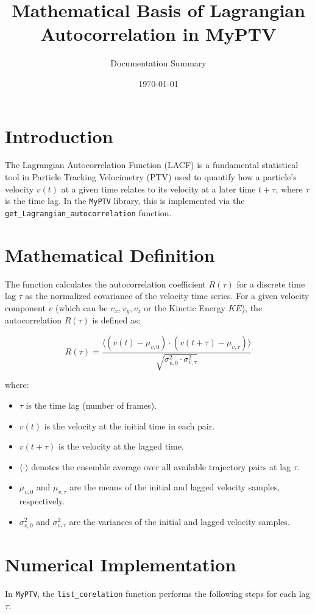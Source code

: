 \documentclass[12pt]{article}
\title{Mathematical Basis of Lagrangian Autocorrelation in MyPTV}
\author{Documentation Summary}
\date{\today}
\begin{document}
\maketitle

\section{Introduction}
The Lagrangian Autocorrelation Function (LACF) is a fundamental statistical tool in Particle Tracking Velocimetry (PTV) used to quantify how a particle's velocity $v(t)$ at a given time relates to its velocity at a later time $t + \tau$, where $\tau$ is the time lag. In the \texttt{MyPTV} library, this is implemented via the \texttt{get\_Lagrangian\_autocorrelation} function.

\section{Mathematical Definition}
The function calculates the autocorrelation coefficient $R(\tau)$ for a discrete time lag $\tau$ as the normalized covariance of the velocity time series. For a given velocity component $v$ (which can be $v_x, v_y, v_z$ or the Kinetic Energy $KE$), the autocorrelation $R(\tau)$ is defined as:

\begin{equation}
R(\tau) = \frac{\langle (v(t) - \mu_{v,0}) \cdot (v(t+\tau) - \mu_{v,\tau}) \rangle}{\sqrt{\sigma^2_{v,0} \cdot \sigma^2_{v,\tau}}}
\end{equation}

where:
\begin{itemize}
    \item $\tau$ is the time lag (number of frames).
    \item $v(t)$ is the velocity at the initial time in each pair.
    \item $v(t+\tau)$ is the velocity at the lagged time.
    \item $\langle \cdot \rangle$ denotes the ensemble average over all available trajectory pairs at lag $\tau$.
    \item $\mu_{v,0}$ and $\mu_{v,\tau}$ are the means of the initial and lagged velocity samples, respectively.
    \item $\sigma^2_{v,0}$ and $\sigma^2_{v,\tau}$ are the variances of the initial and lagged velocity samples.
\end{itemize}

\section{Numerical Implementation}
In \texttt{MyPTV}, the \texttt{list\_corelation} function performs the following steps for each lag $\tau$:
\end{document}
